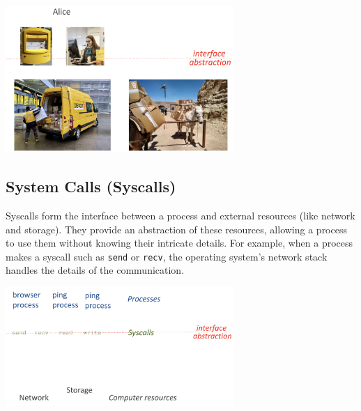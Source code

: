 \begin{center}
  \includegraphics[width=0.65\textwidth]{chapters/L1/images/postal.png}
\end{center}

\subsection{System Calls (Syscalls)}

Syscalls form the interface between a process and external resources (like network and storage). They provide an abstraction of these resources, allowing a process to use them without knowing their intricate details. For example, when a process makes a syscall such as \texttt{send} or \texttt{recv}, the operating system’s network stack handles the details of the communication.

\begin{center}
  \includegraphics[width=0.65\textwidth]{chapters/L1/images/syscalls.png}
\end{center}

\newpage
